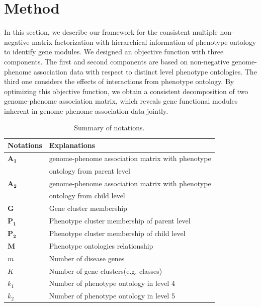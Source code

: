 \documentclass{bmcart}
\begin{document}

\section*{Method}
In this section, we describe our framework for the consistent multiple non-negative matrix
factorization with hierarchical information of phenotype ontology to identify gene modules.
We designed an objective function with three components. The first and second components are based on non-negative genome-phenome association data with respect to distinct level phenotype ontologies. The third one considers the effects of interactions from phenotype ontology. By optimizing this objective function, we obtain a consistent decomposition of two genome-phenome association matrix, which reveals gene functional modules inherent in genome-phenome association data jointly.
\begin{table}[t!]
 \caption{Summary of notations.}\label{Tab:Notations}
\begin{tabular}{|l|l|}
    \hline
    Notations & Explanations\\
    \hline\hline
    $\bm{A_1}$ & genome-phenome association matrix with phenotype\\
    & ontology from parent level\\
    $\bm{A_2}$ & genome-phenome association matrix with phenotype\\
    & ontology from child level\\
    $\bm{G}$ & Gene cluster membership\\
    $\bm{P_1}$ & Phenotype cluster membership of parent level\\
    $\bm{P_2}$ & Phenotype cluster membership of child level\\
    $\bm{M}$ & Phenotype ontologies relationship\\
    $m$ & Number of disease genes\\
    $K$ & Number of gene clusters(e.g. classes)\\
    $k_1$ & Number of phenotype ontology in level 4\\
    $k_2$ & Number of phenotype ontology in level 5\\
    \hline
  \end{tabular}
\end{table}
\end{document}
